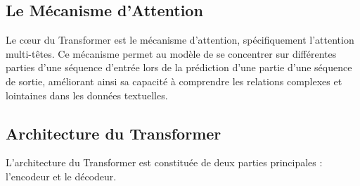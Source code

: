 \documentclass[
  letterpaper,
  DIV=11,
  numbers=noendperiod]{scrreprt}
\begin{document}
\subsection{Le Mécanisme d'Attention}\label{le-muxe9canisme-dattention}

Le cœur du Transformer est le mécanisme d'attention, spécifiquement
l'attention multi-têtes. Ce mécanisme permet au modèle de se concentrer
sur différentes parties d'une séquence d'entrée lors de la prédiction
d'une partie d'une séquence de sortie, améliorant ainsi sa capacité à
comprendre les relations complexes et lointaines dans les données
textuelles.

\subsection{Architecture du
Transformer}\label{architecture-du-transformer}

L'architecture du Transformer est constituée de deux parties principales
: l'encodeur et le décodeur.
\end{document}
